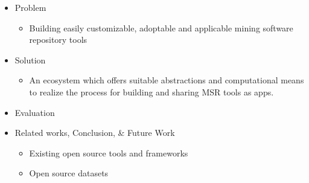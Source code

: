     \begin{frame}
        \begin{itemize}
            \item Problem
            \begin{itemize}
                \item Building easily customizable, adoptable and applicable mining software repository tools
            \end{itemize}

            \item Solution
            \begin{itemize}
                \item An ecosystem which offers suitable abstractions and computational means to realize the process for building and sharing MSR tools as apps.
            \end{itemize}


            \item Evaluation

            \item Related works, Conclusion, \& Future Work
              \begin{itemize}
                \item Existing open source tools and frameworks
                \item Open source datasets
              \end{itemize}
        \end{itemize}
    \end{frame}
